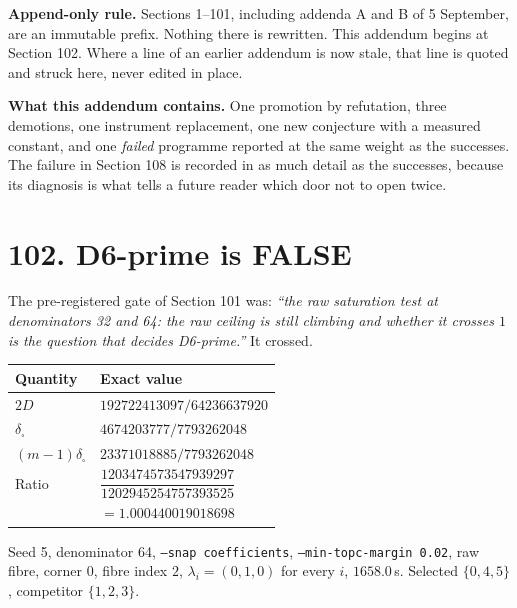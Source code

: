 \documentclass[9pt,twocolumn]{article}
\renewcommand{\_}{\CIGunderscore\allowbreak}
\begin{document}
\sloppy
{}

\textbf{Append-only rule.} Sections 1--101, including addenda A and B of 5 September, are an immutable prefix. Nothing there is rewritten. This addendum begins at Section 102. Where a line of an earlier addendum is now stale, that line is quoted and struck here, never edited in place.

\textbf{What this addendum contains.} One promotion by refutation, three demotions, one instrument replacement, one new conjecture with a measured constant, and one \emph{failed} programme reported at the same weight as the successes. The failure in Section 108 is recorded in as much detail as the successes, because its diagnosis is what tells a future reader which door not to open twice.

\section*{102. D6-prime is FALSE}
The pre-registered gate of Section 101 was: \emph{``the raw saturation test at denominators 32 and 64: the raw ceiling is still climbing and whether it crosses $1$ is the question that decides D6-prime.''} It crossed.

\begin{center}\scriptsize
\begin{tabularx}{0.98\columnwidth}{>{\raggedright\arraybackslash}p{}X}
\toprule
Quantity & Exact value\\
\midrule
$2D$ & $192722413097/64236637920$\\
$\delta_{\square}$ & $4674203777/7793262048$\\
$(m-1)\delta_{\square}$ & $23371018885/7793262048$\\
Ratio & $\dfrac{1203474573547939297}{1202945254757393525}$\\
 & $=1.000440019018698$\\
\bottomrule
\end{tabularx}
\end{center}
Seed 5, denominator 64, \texttt{--snap coefficients}, \texttt{--min-topc-margin 0.02}, raw fibre, corner $0$, fibre index $2$, $\lambda_i=(0,1,0)$ for every $i$, $1658.0$\,s. Selected $\{0,4,5\}$, competitor $\{1,2,3\}$.
\end{document}
